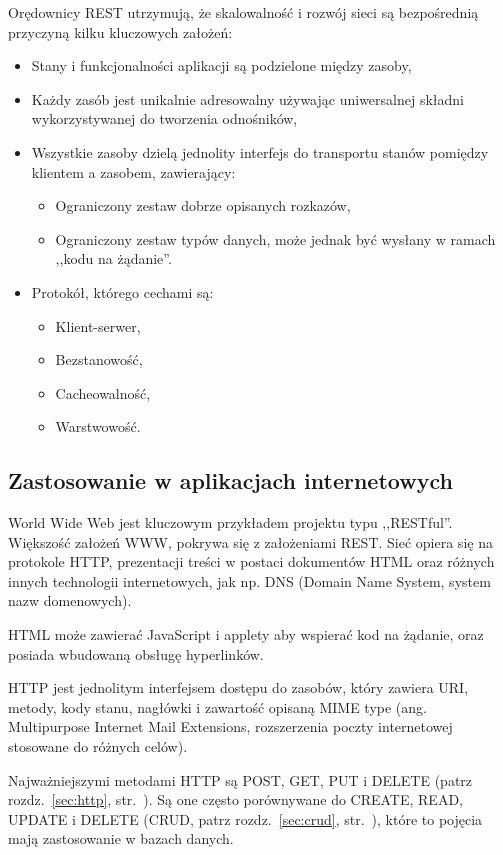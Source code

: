 \documentclass[a4paper,12pt,oneside]{report}
\begin{document}
Orędownicy REST utrzymują, że skalowalność i rozwój sieci są bezpośrednią przyczyną kilku kluczowych założeń:
\begin{itemize}
  \item Stany i funkcjonalności aplikacji są podzielone między zasoby,
  \item Każdy zasób jest unikalnie adresowalny używając uniwersalnej składni wykorzystywanej do tworzenia odnośników,
  \item Wszystkie zasoby dzielą jednolity interfejs do transportu stanów pomiędzy klientem a zasobem, zawierający:
  \begin{itemize}
    \item Ograniczony zestaw dobrze opisanych rozkazów,
    \item Ograniczony zestaw typów danych, może jednak być wysłany w ramach ,,kodu na żądanie''.
  \end{itemize}
  \item Protokół, którego cechami są:
  \begin{itemize}
    \item Klient-serwer,
    \item Bezstanowość,
    \item Cacheowalność,
    \item Warstwowość.
  \end{itemize}
\end{itemize}

\subsection{Zastosowanie w aplikacjach internetowych}
\label{rest:web}

World Wide Web jest kluczowym przykładem projektu typu ,,RESTful''. Większość założeń WWW, pokrywa się z założeniami REST. Sieć opiera się na protokole HTTP, prezentacji treści w postaci dokumentów HTML oraz różnych innych technologii internetowych, jak np. DNS (Domain Name System, system nazw domenowych).

HTML może zawierać JavaScript i applety aby wspierać kod na żądanie, oraz posiada wbudowaną obsługę hyperlinków.

HTTP jest jednolitym interfejsem dostępu do zasobów, który zawiera URI, metody, kody stanu, nagłówki i zawartość opisaną MIME type (ang. Multipurpose Internet Mail Extensions, rozszerzenia poczty internetowej stosowane do różnych celów).

Najważniejszymi metodami HTTP są POST, GET, PUT i DELETE (patrz rozdz.~\ref{sec:http}, str.~\pageref{sec:http}). Są one często porównywane do CREATE, READ, UPDATE i DELETE (CRUD, patrz rozdz.~\ref{sec:crud}, str.~\pageref{sec:crud}), które to pojęcia mają zastosowanie w bazach danych.
\end{document}
